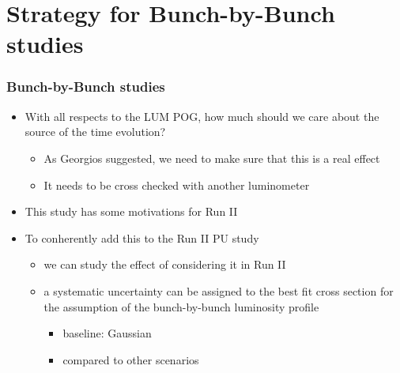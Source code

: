 \section{Strategy for Bunch-by-Bunch studies}
\begin{frame}
  \frametitle{Bunch-by-Bunch studies}
  \begin{itemize}
  \item With all respects to the LUM POG, how much should we care about the source of the time evolution?
    \begin{itemize}
    \item As Georgios suggested, we need to make sure that this is a real effect
    \item It needs to be cross checked with another luminometer
    \end{itemize}
  \item This study has some motivations for Run II
  \item To conherently add this to the Run II PU study
    \begin{itemize}
    \item we can study the effect of considering it in Run II
    \item a systematic uncertainty can be assigned to the best fit cross section for the assumption of the bunch-by-bunch luminosity profile
      \begin{itemize}
      \item baseline: Gaussian
      \item compared to other scenarios
      \end{itemize}
    \end{itemize}
  \end{itemize}
\end{frame}
